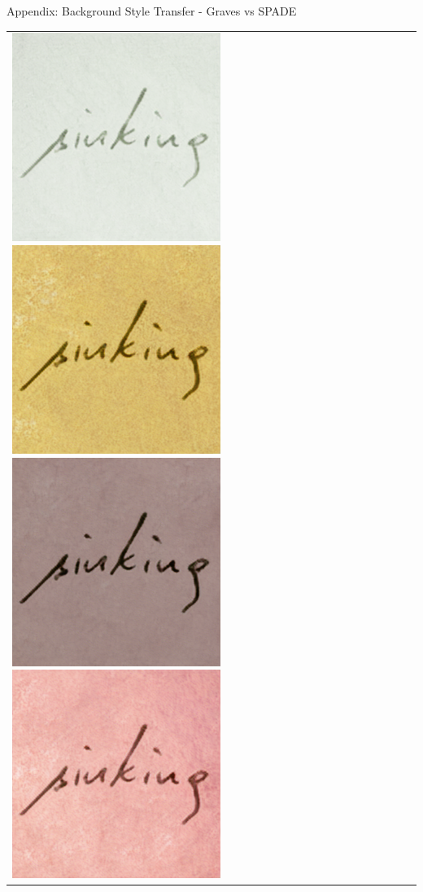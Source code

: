 \documentclass[aspectratio=169]{beamer}
\begin{document}
\begin{frame}{Appendix: Background Style Transfer - Graves vs SPADE}
{\begin{tabular}{lc}
{  \includegraphics[scale=0.18]{../thesis/assets/background_style_transfer/spade/result/46.png}%
  \includegraphics[scale=0.18]{../thesis/assets/background_style_transfer/spade/result/49.png}%
  \includegraphics[scale=0.18]{../thesis/assets/background_style_transfer/spade/result/31.png}%
  \includegraphics[scale=0.18]{../thesis/assets/background_style_transfer/spade/result/74.png}%
}
\end{tabular}}
\end{frame}
\end{document}
